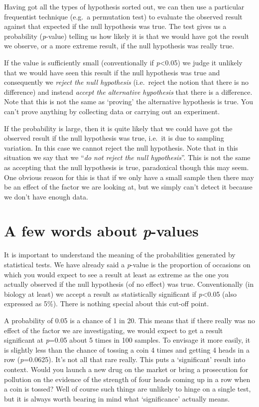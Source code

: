 \documentclass[]{book}
\begin{document}
Having got all the types of hypothesis sorted out, we can then use a
particular frequentist technique (e.g.~a permutation test) to evaluate
the observed result against that expected if the null hypothesis was
true. The test gives us a probability (\emph{p}-value) telling us how
likely it is that we would have got the result we observe, or a more
extreme result, if the null hypothesis was really true.

If the value is sufficiently small (conventionally if
\emph{p}\textless{}0.05) we judge it unlikely that we would have seen
this result if the null hypothesis was true and consequently we
\emph{reject the null hypothesis} (i.e.~reject the notion that there is
no difference) and instead \emph{accept the alternative hypothesis} that
there is a difference. Note that this is not the same as `proving' the
alternative hypothesis is true. You can't prove anything by collecting
data or carrying out an experiment.

If the probability is large, then it is quite likely that we could have
got the observed result if the null hypothesis was true, i.e.~it is due
to sampling variation. In this case we cannot reject the null
hypothesis. Note that in this situation we say that we ``\emph{do not
reject the null hypothesis}''. This is not the same as accepting that
the null hypothesis is true, paradoxical though this may seem. One
obvious reason for this is that if we only have a small sample then
there may be an effect of the factor we are looking at, but we simply
can't detect it because we don't have enough data.

\section{\texorpdfstring{A few words about
\emph{p}-values}{A few words about p-values}}\label{a-few-words-about-p-values}

It is important to understand the meaning of the probabilities generated
by statistical tests. We have already said a \emph{p}-value is the
proportion of occasions on which you would expect to see a result at
least as extreme as the one you actually observed if the null hypothesis
(of no effect) was true. Conventionally (in biology at least) we accept
a result as statistically significant if \emph{p}\textless{}0.05 (also
expressed as 5\%). There is nothing special about this cut-off point.

A probability of 0.05 is a chance of 1 in 20. This means that if there
really was no effect of the factor we are investigating, we would expect
to get a result significant at \emph{p}=0.05 about 5 times in 100
samples. To envisage it more easily, it is slightly less than the chance
of tossing a coin 4 times and getting 4 heads in a row
(\emph{p}=0.0625). It's not all that rare really. This puts a
`significant' result into context. Would you launch a new drug on the
market or bring a prosecution for pollution on the evidence of the
strength of four heads coming up in a row when a coin is tossed? Well of
course such things are unlikely to hinge on a single test, but it is
always worth bearing in mind what `significance' actually means.
\end{document}
